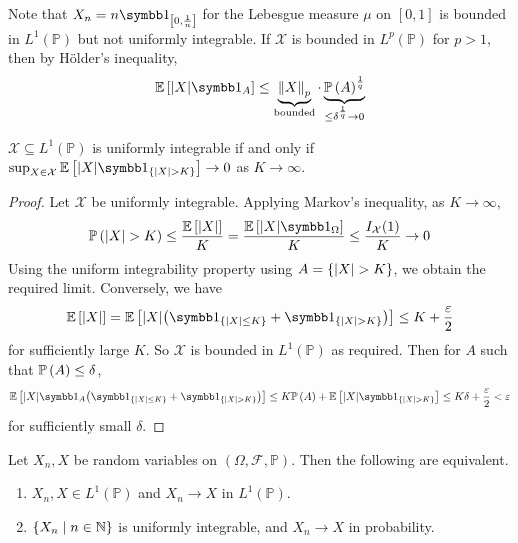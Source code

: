 \begin{remark}
	Note that \( X_n = n\symbb 1_{\qty[0,\frac{1}{n}]} \) for the Lebesgue measure \( \mu \) on \( [0,1] \) is bounded in \( L^1(\mathbb P) \) but not uniformly integrable.
	If \( \mathcal X \) is bounded in \( L^p(\mathbb P) \) for \( p > 1 \), then by H\"older's inequality,
	\[ \expect{\abs{X}\symbb 1_A} \leq \underbrace{\norm{X}_p}_{\text{bounded}} \cdot \underbrace{\prob{A}^{\frac 1 q}}_{\leq \delta^{\frac 1 q} \to 0} \]
\end{remark}
\begin{lemma}
	\( \mathcal X \subseteq L^1(\mathbb P) \) is uniformly integrable if and only if \( \sup_{X \in \mathcal X} \expect{\abs{X} \symbb 1_{\qty{\abs{X} > K}}} \to 0 \) as \( K \to \infty \).
\end{lemma}
\begin{proof}
	Let \( \mathcal X \) be uniformly integrable.
	Applying Markov's inequality, as \( K \to \infty \),
	\[ \prob{\abs{X} > K} \leq \frac{\expect{\abs{X}}}{K} = \frac{\expect{\abs{X}\symbb 1_{\Omega}}}{K} \leq \frac{I_{\mathcal X}(1)}{K} \to 0 \]
	Using the uniform integrability property using \( A = \qty{\abs{X} > K} \), we obtain the required limit.
	Conversely, we have
	\[ \expect{\abs{X}} = \expect{\abs{X}\qty(\symbb 1_{\qty{\abs{X} \leq K}} + \symbb 1_{\qty{\abs{X} > K}})} \leq K + \frac{\varepsilon}{2} \]
	for sufficiently large \( K \).
	So \( \mathcal X \) is bounded in \( L^1(\mathbb P) \) as required.
	Then for \( A \) such that \( \mathbb{P}\left({A}\right) \leq \delta \),
	\[ \expect{\abs{X}\symbb 1_A\qty(\symbb 1_{\qty{\abs{X} \leq K}} + \symbb 1_{\qty{\abs{X} > K}})} \leq K\prob{A} + \expect{\abs{X}\symbb 1_{\qty{\abs{X} > K}}} \leq K\delta + \frac{\varepsilon}{2} < \varepsilon \]
	for sufficiently small \( \delta \).
\end{proof}
\begin{theorem}
	Let \( X_n, X \) be random variables on \( (\Omega, \mathcal F, \mathbb P) \).
	Then the following are equivalent.
	\begin{enumerate}
		\item \( X_n, X \in L^1(\mathbb P) \) and \( X_n \to X \) in \( L^1(\mathbb P) \).
		\item \( \qty{X_n \mid n \in \mathbb N} \) is uniformly integrable, and \( X_n \to X \) in probability.
	\end{enumerate}
\end{theorem}
